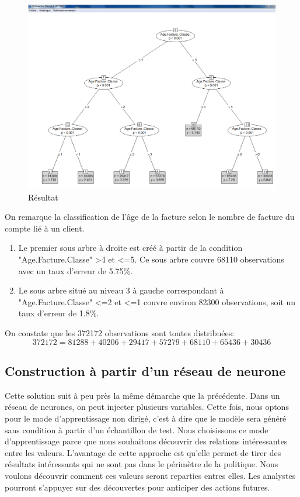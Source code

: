 \documentclass[11pt,a4paper]{report}
\begin{document}
\begin{figure}[h]
   \centering
   \includegraphics[scale=0.45]{ageclassenbfaturesimple_tree.PNG}
     \caption{Résultat}
     \label{figure16}
\end{figure}
\newpage
On remarque la classification de l'âge de la facture selon le nombre de facture du compte lié à un client. 
\begin{enumerate}
\item Le premier sous arbre  à droite est créé à partir de la condition "Age.Facture.Classe" >4 et <=5. Ce sous arbre couvre 68110 observations avec un taux d'erreur de 5.75\%.

\item Le sous arbre situé au niveau 3 à gauche correspondant à "Age.Facture.Classe" <=2 et <=1 couvre environ 82300 observations, soit un taux d'erreur de 1.8\%.
\end{enumerate}

On constate que les 372172 observations sont toutes distribuées:
\begin{equation}
          372172=81288+40206+29417+57279+68110+65436+30436
\end{equation}



\subsection{Construction à partir d'un réseau de neurone}
Cette solution suit à peu près la même démarche que la précédente. Dans un réseau de neurones, on peut injecter plusieurs variables. Cette fois, nous optons pour le mode d'apprentissage non dirigé, c'est à dire que le modèle sera généré sans condition à partir d'un échantillon de test. Nous choisissons ce mode d'apprentissage parce que nous souhaitons découvrir des relations intéressantes entre les valeurs. L'avantage de cette approche est qu'elle permet de tirer des résultats intéressants qui ne sont pas dans le périmètre de la politique. Nous voulons découvrir comment ces valeurs seront reparties entres elles. Les analystes pourront s'appuyer sur des découvertes pour anticiper des actions futures.     
 
\end{document}
